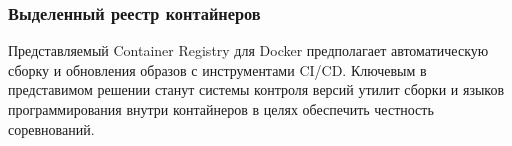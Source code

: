 \subsubsection{Выделенный реестр контайнеров}

Представляемый Container Registry для Docker предполагает автоматическую сборку и обновления образов с инструментами CI/CD.
Ключевым в представимом решении станут системы контроля версий утилит сборки и языков программирования внутри контайнеров в целях обеспечить честность соревнований.






